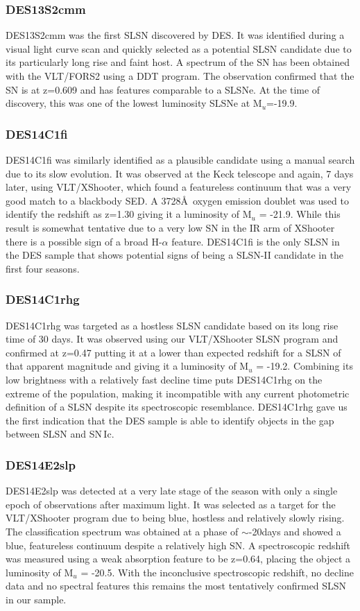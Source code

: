 \subsubsection{DES13S2cmm}
DES13S2cmm was the first SLSN discovered by DES. It was identified during a visual light curve scan and quickly selected as a potential SLSN candidate due to its particularly long rise and faint host. A spectrum of the SN has been obtained with the VLT/FORS2 using a DDT program. The observation confirmed that the SN is at z=0.609 and has features comparable to a SLSNe. At the time of discovery, this was one of the lowest luminosity SLSNe at M$_u$=-19.9.

\subsubsection{DES14C1fi}
DES14C1fi was similarly identified as a plausible candidate using a manual search due to its slow evolution. It was observed at the Keck telescope and again, 7 days later, using VLT/XShooter, which found a featureless continuum that was a very good match to a blackbody SED. A 3728\AA~oxygen emission doublet was used to identify the redshift as z=1.30 giving it a luminosity of M$_u$ = -21.9. While this result is somewhat tentative due to a very low S\/N in the IR arm of XShooter there is a possible sign of a broad H-$\alpha$ feature. DES14C1fi is the only SLSN in the DES sample that shows potential signs of being a SLSN-II candidate in the first four seasons.

\subsubsection{DES14C1rhg}
DES14C1rhg was targeted as a hostless SLSN candidate based on its long rise time of 30 days. It was observed using our VLT/XShooter SLSN program and confirmed at z=0.47 putting it at a lower than expected redshift for a SLSN of that apparent magnitude and giving it a luminosity of M$_u$ = -19.2. Combining its low brightness with a relatively fast decline time puts DES14C1rhg on the extreme of the population, making it incompatible with any current photometric definition of a SLSN despite its spectroscopic resemblance. DES14C1rhg gave us the first indication that the DES sample is able to identify objects in the gap between SLSN and SN\,Ic.

\subsubsection{DES14E2slp}
DES14E2slp was detected at a very late stage of the season with only a single epoch of observations after maximum light. It was selected as a target for the VLT/XShooter program due to being blue, hostless and relatively slowly rising. The classification spectrum was obtained at a phase of $\sim$-20days and showed a blue, featureless continuum despite a relatively high S\/N. A spectroscopic redshift was measured using a weak absorption feature to be z=0.64, placing the object a luminosity of M$_u$ = -20.5. With the inconclusive spectroscopic redshift, no decline data and no spectral features this remains the most tentatively confirmed SLSN in our sample.

